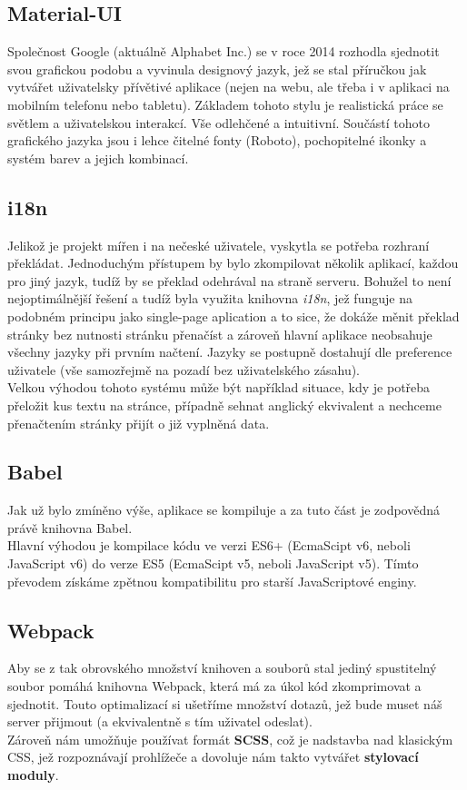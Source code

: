 \subsection{Material-UI}
Společnost Google (aktuálně Alphabet Inc.) se v roce 2014 rozhodla sjednotit svou grafickou podobu a
vyvinula designový jazyk, jež se stal příručkou jak vytvářet uživatelsky přívětivé aplikace (nejen na webu, ale třeba
i v aplikaci na mobilním telefonu nebo tabletu). Základem tohoto stylu je realistická práce se světlem
a uživatelskou interakcí. Vše odlehčené a intuitivní. Součástí tohoto grafického jazyka jsou i
lehce čitelné fonty (Roboto), pochopitelné ikonky a systém barev a jejich kombinací.

\subsection{i18n}
Jelikož je projekt mířen i na nečeské uživatele, vyskytla se potřeba rozhraní překládat.
Jednoduchým přístupem by bylo zkompilovat několik aplikací, každou pro jiný jazyk, tudíž
by se překlad odehrával na straně serveru. Bohužel to není nejoptimálnější řešení a
tudíž byla využita knihovna \textit{i18n}, jež funguje na podobném principu jako single-page aplication a
to sice, že dokáže měnit překlad stránky bez nutnosti stránku přenačíst a zároveň hlavní aplikace
neobsahuje všechny jazyky při prvním načtení. Jazyky se postupně dostahují dle preference uživatele
(vše samozřejmě na pozadí bez uživatelského zásahu).\\
Velkou výhodou tohoto systému může být například situace, kdy je potřeba přeložit kus textu na stránce,
případně sehnat anglický ekvivalent a nechceme přenačtením stránky přijít o již vyplněná data.

\subsection{Babel}
Jak už bylo zmíněno výše, aplikace se kompiluje a za tuto část je zodpovědná právě knihovna Babel.\\
Hlavní výhodou je kompilace kódu ve verzi ES6+ (EcmaScipt v6, neboli JavaScript v6) do verze
ES5 (EcmaScipt v5, neboli JavaScript v5).
Tímto převodem získáme zpětnou kompatibilitu pro starší JavaScriptové enginy.

\subsection{Webpack}
Aby se z tak obrovského množství knihoven a souborů stal jediný spustitelný soubor pomáhá
knihovna Webpack, která má za úkol kód zkomprimovat a sjednotit. Touto optimalizací si ušetříme
množství dotazů, jež bude muset náš server přijmout (a ekvivalentně s tím uživatel odeslat).\\
Zároveň nám umožňuje používat formát \textbf{SCSS}, což je nadstavba nad klasickým CSS, jež 
rozpoznávají prohlížeče a dovoluje nám takto vytvářet \textbf{stylovací moduly}.

